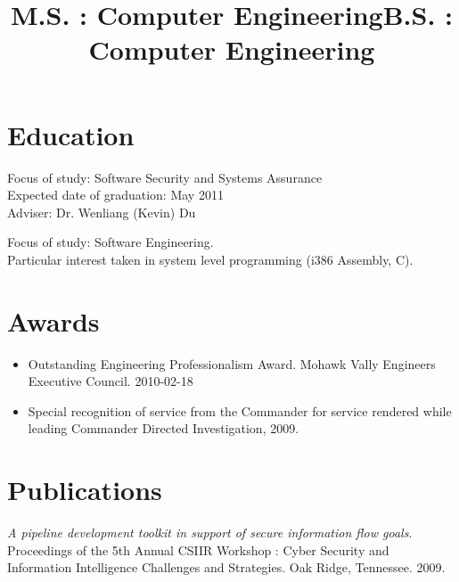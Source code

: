 \begin {resume}
    \section {Education}
    \title {M.S. : Computer Engineering}
    \begin {position}
      Focus of study: Software Security and Systems Assurance\\
      Expected date of graduation: May 2011\\
      Adviser: Dr. Wenliang (Kevin) Du
    \end {position}
    \title {B.S. : Computer Engineering}
    \begin {position}
      Focus of study: Software Engineering.\\
      Particular interest taken in system level programming (i386 Assembly, C).
    \end {position}
    \section {Awards}
    \begin {itemize}
      \setlength {\itemsep}{1pt}
      \setlength {\parskip}{0pt}
      \setlength {\parsep}{0pt}
    \item Outstanding Engineering Professionalism Award.
      Mohawk Vally Engineers Executive Council.
      2010-02-18
    \item Special recognition of service from the Commander for service rendered while leading Commander Directed Investigation, 2009.
    \end {itemize}

    \section {Publications}
    {\it A pipeline development toolkit in support of secure information flow goals}.
    Proceedings of the 5th Annual CSIIR Workshop : Cyber Security and Information Intelligence Challenges and Strategies.
    Oak Ridge, Tennessee.
    2009.

\end{resume}
